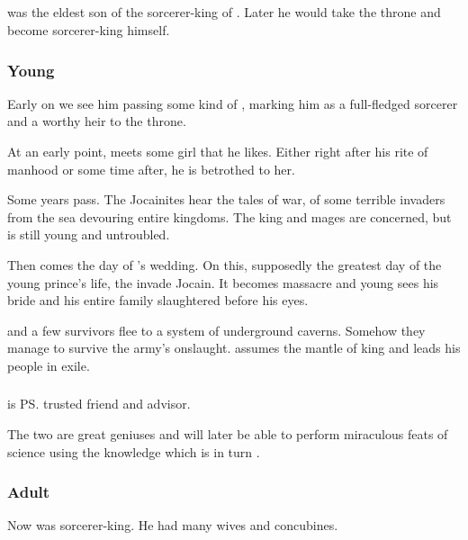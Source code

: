 \subsection{\Semiza}
\Semiza{} was the eldest son of the \nephil{} sorcerer-king of \Girigor. 
Later he would take the throne and become sorcerer-king himself. 





\subsubsection{Young \Semiza}
Early on we see him passing some kind of , marking him as a full-fledged sorcerer and a worthy heir to the throne. 

At an early point, \Semiza{} meets some girl that he likes. 
Either right after his rite of manhood or some time after, he is betrothed to her. 

Some years pass. 
The Jocainites hear the tales of war, of some terrible invaders from the sea devouring entire kingdoms. 
The king and mages are concerned, but \Semiza{} is still young and untroubled. 

Then comes the day of \Semiza{}'s wedding. 
On this, supposedly the greatest day of the young prince's life, the \dragons{} invade Jocain. 
It becomes massacre and young \Semiza{} sees his bride and his entire family slaughtered before his eyes. 

\Semiza{} and a few survivors flee to a system of underground caverns. 
Somehow they manage to survive the \draconic{} army's onslaught. 
\Semiza{} assumes the mantle of king and leads his people in exile. 





\subsubsection{\Eshayzal}
\Eshayzal{} is \ps{\Semiza}{} trusted friend and advisor. 

The two are great geniuses and will later be able to perform miraculous feats of science using the \dash knowledge which is in turn .





\subsubsection{Adult \Semiza}
Now \Semiza{} was sorcerer-king.
He had many wives and concubines. 

